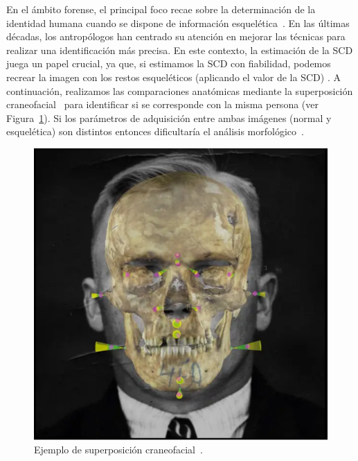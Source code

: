 En el ámbito forense, el principal foco recae sobre la determinación de la identidad humana cuando se dispone de información esquelética~\cite{15}. En las últimas décadas, los antropólogos han centrado su atención en mejorar las técnicas para realizar una identificación más precisa. En este contexto, la estimación de la SCD juega un papel crucial, ya que, si estimamos la SCD con fiabilidad, podemos recrear la imagen con los restos esqueléticos (aplicando el valor de la SCD) \cite{21}. A continuación, realizamos las comparaciones anatómicas mediante la superposición craneofacial~\cite{22} para identificar si se corresponde con la misma persona (ver Figura~\ref{fig2}). Si los parámetros de adquisición entre ambas imágenes (normal y esquelética) son distintos entonces dificultaría el análisis morfológico~\cite{13}.

\begin{figure}[h]
	\centering
	\includegraphics[scale=0.25]{imagenes/cap1/skull_superimposition.png}
	\caption{Ejemplo de superposición craneofacial~\cite{23}.}
	\label{fig2}
\end{figure}

